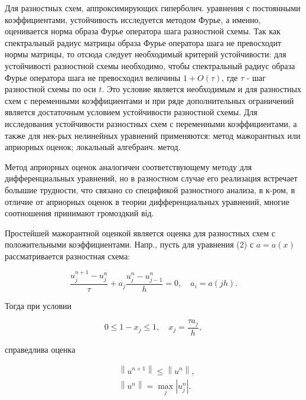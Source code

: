 \documentclass[10pt]{article}
\begin{document}
Для разностных схем, аппроксимирующих гиперболич. уравнения с постоянными коэффициентами, устойчивость исследуется методом Фурье, а именно, оценивается норма образа Фурье оператора шага разностной схемы. Так как спектральный радиус матрицы образа Фурье оператора шага не превосходит нормы матрицы, то отсюда следует необходимый критерий устойчивости: для устойчивості разностной схемы необходимо, чтобы спектральный радиус образа Фурье оператора шага не превосходил величины $1+O(\tau)$, где $\tau$ - шаг разностной схемы по оси $t$. Это условие является необходимым и для разностных схем с переменными коэффициентами и при ряде дополнительных ограничений является достаточным условием устойчивости разностной схемы. Для исследования устойчивости разностных схем с переменными коэффициентами, а также для нек-рых нелинейных уравнений применяются: метод мажорантных или априорных оценок; локальный алгебраич. метод.



Метод априорных оценок аналогичен соответствующему методу для дифференциальных уравнений, но в разностном случае его реализация встречает болышие трудности, что связано со спецификой разностного анализа, в к-ром, в отличие от априорных оценок в теории дифференциальных уравнений, многие соотношения принимают громоздкий від.



Простейшей мажорантной оценкой является оценка для разностных схем с положительными коэффициентами. Напр., пусть для уравнения (2) с $a=a(x)$ рассматривается разностная схема:



\[

\frac{u_{j}^{n+1}-u_{j}^{n}}{\tau}+a_{j} \frac{u_{j}^{n}-u_{j-1}^{n}}{h}=0, \quad a_{i}=a(j h) .

\]



Тогда при условии



\[

0 \leqslant 1-x_{j} \leqslant 1, \quad x_{j}=\frac{\tau a_{j}}{h},

\]



справедлива оценка



\[

\begin{aligned}

& \left\|u^{n+1}\right\| \leqslant\left\|u^{n}\right\|, \\

& \left\|u^{n}\right\|=\max _{j}\left|u_{j}^{n}\right| .

\end{aligned}

\]
\end{document}
